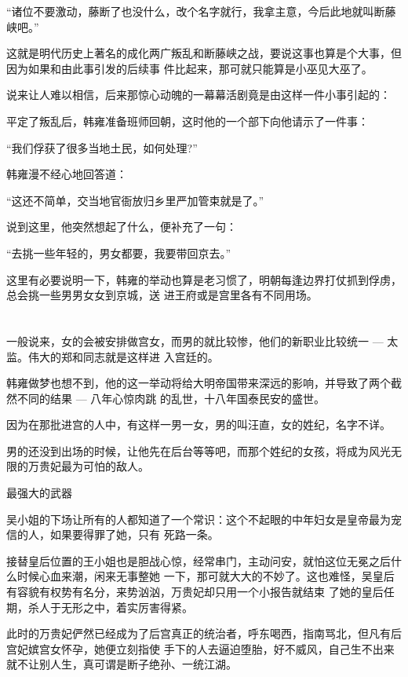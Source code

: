 \documentclass[11pt,a4paper,onecolumn]{article}
\begin{document}
``诸位不要激动，藤断了也没什么，改个名字就行，我拿主意，今后此地就叫断藤峡吧。''

这就是明代历史上著名的成化两广叛乱和断藤峡之战，要说这事也算是个大事，但因为如果和由此事引发的后续事
件比起来，那可就只能算是小巫见大巫了。

说来让人难以相信，后来那惊心动魄的一幕幕活剧竟是由这样一件小事引起的：

平定了叛乱后，韩雍准备班师回朝，这时他的一个部下向他请示了一件事：

``我们俘获了很多当地土民，如何处理?''

韩雍漫不经心地回答道：

``这还不简单，交当地官衙放归乡里严加管束就是了。''

说到这里，他突然想起了什么，便补充了一句：

``去挑一些年轻的，男女都要，我要带回京去。''

这里有必要说明一下，韩雍的举动也算是老习惯了，明朝每逢边界打仗抓到俘虏，总会挑一些男男女女到京城，送
进王府或是宫里各有不同用场。

\section[\thesection]{}

一般说来，女的会被安排做宫女，而男的就比较惨，他们的新职业比较统一 --- 太监。伟大的郑和同志就是这样进
入宫廷的。

韩雍做梦也想不到，他的这一举动将给大明帝国带来深远的影响，并导致了两个截然不同的结果 --- 八年心惊肉跳
的乱世，十八年国泰民安的盛世。

因为在那批进宫的人中，有这样一男一女，男的叫汪直，女的姓纪，名字不详。

男的还没到出场的时候，让他先在后台等等吧，而那个姓纪的女孩，将成为风光无限的万贵妃最为可怕的敌人。

最强大的武器

吴小姐的下场让所有的人都知道了一个常识：这个不起眼的中年妇女是皇帝最为宠信的人，如果要得罪了她，只有
死路一条。

接替皇后位置的王小姐也是胆战心惊，经常串门，主动问安，就怕这位无冕之后什么时候心血来潮，闲来无事整她
一下，那可就大大的不妙了。这也难怪，吴皇后有容貌有权势有名分，来势汹汹，万贵妃却只用一个小报告就结束
了她的皇后任期，杀人于无形之中，着实厉害得紧。

此时的万贵妃俨然已经成为了后宫真正的统治者，呼东喝西，指南骂北，但凡有后宫妃嫔宫女怀孕，她便立刻指使
手下的人去逼迫堕胎，好不威风，自己生不出来就不让别人生，真可谓是断子绝孙、一统江湖。
\end{document}
